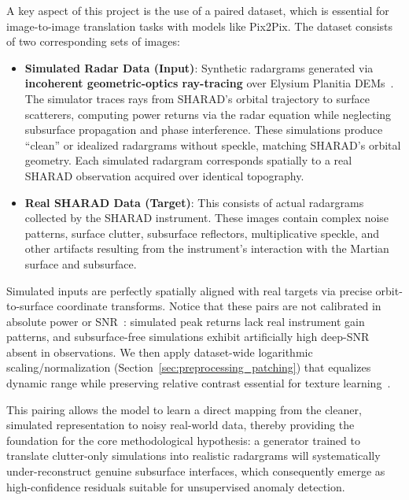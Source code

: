 A key aspect of this project is the use of a paired dataset, which is essential for image-to-image translation tasks with models like Pix2Pix.
The dataset consists of two corresponding sets of images:
\begin{itemize}
    \item \textbf{Simulated Radar Data (Input)}: Synthetic radargrams generated via \textbf{incoherent geometric-optics ray-tracing} over Elysium Planitia DEMs~\cite{SimIncoherentRS2024}. The simulator traces rays from SHARAD's orbital trajectory to surface scatterers, computing power returns via the radar equation while neglecting subsurface propagation and phase interference. These simulations produce \enquote{clean} or idealized radargrams without speckle, matching SHARAD's orbital geometry. Each simulated radargram corresponds spatially to a real SHARAD observation acquired over identical topography.
    \item \textbf{Real SHARAD Data (Target)}: This consists of actual radargrams collected by the SHARAD instrument. These images contain complex noise patterns, surface clutter, subsurface reflectors, multiplicative speckle, and other artifacts resulting from the instrument's interaction with the Martian surface and subsurface.
\end{itemize}
Simulated inputs are perfectly spatially aligned with real targets via precise orbit-to-surface coordinate transforms.
Notice that these pairs are not calibrated in absolute power or SNR~\cite{Seu_2007}: simulated peak returns lack real instrument gain patterns, and subsurface-free simulations exhibit artificially high deep-SNR absent in observations.
We then apply dataset-wide logarithmic scaling/normalization (Section~\ref{sec:preprocessing_patching}) that equalizes dynamic range while preserving relative contrast essential for texture learning~\cite{Zhu_2017}.

This pairing allows the model to learn a direct mapping from the cleaner, simulated representation to noisy real-world data, thereby providing the foundation for the core methodological hypothesis: a generator trained to translate clutter-only simulations into realistic radargrams will systematically under-reconstruct genuine subsurface interfaces, which consequently emerge as high-confidence residuals suitable for unsupervised anomaly detection.

